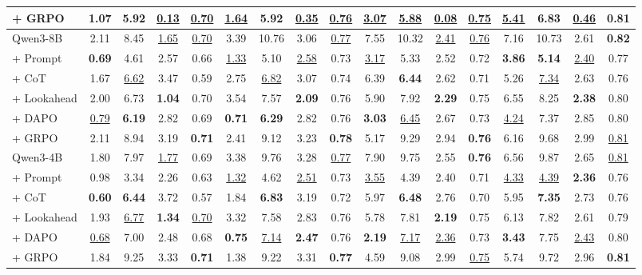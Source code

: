\begin{table}[t]
\begin{tabular}{l cccc cccc cccc cccc}
\scriptsize + GRPO & 1.07 & \textbf{5.92} & \underline{0.13} & \underline{0.70} & \underline{1.64} & \textbf{5.92} & \underline{0.35} & \underline{0.76} & \underline{3.07} & \underline{5.88} & \underline{0.08} & \underline{0.75} & \underline{5.41} & 6.83 & \underline{0.46} & \textbf{0.81} \\
\midrule
Qwen3-8B & 2.11 & 8.45 & \underline{1.65} & \underline{0.70} & 3.39 & 10.76 & 3.06 & \underline{0.77} & 7.55 & 10.32 & \underline{2.41} & \underline{0.76} & 7.16 & 10.73 & 2.61 & \textbf{0.82} \\
\scriptsize + Prompt & \textbf{0.69} & 4.61 & 2.57 & 0.66 & \underline{1.33} & 5.10 & \underline{2.58} & 0.73 & \underline{3.17} & 5.33 & 2.52 & 0.72 & \textbf{3.86} & \textbf{5.14} & \underline{2.40} & 0.77 \\
\scriptsize + CoT & 1.67 & \underline{6.62} & 3.47 & 0.59 & 2.75 & \underline{6.82} & 3.07 & 0.74 & 6.39 & \textbf{6.44} & 2.62 & 0.71 & 5.26 & \underline{7.34} & 2.63 & 0.76 \\
\scriptsize + Lookahead & 2.00 & 6.73 & \textbf{1.04} & 0.70 & 3.54 & 7.57 & \textbf{2.09} & 0.76 & 5.90 & 7.92 & \textbf{2.29} & 0.75 & 6.55 & 8.25 & \textbf{2.38} & 0.80 \\
\scriptsize + DAPO & \underline{0.79} & \textbf{6.19} & 2.82 & 0.69 & \textbf{0.71} & \textbf{6.29} & 2.82 & 0.76 & \textbf{3.03} & \underline{6.45} & 2.67 & 0.73 & \underline{4.24} & 7.37 & 2.85 & 0.80 \\
\scriptsize + GRPO & 2.11 & 8.94 & 3.19 & \textbf{0.71} & 2.41 & 9.12 & 3.23 & \textbf{0.78} & 5.17 & 9.29 & 2.94 & \textbf{0.76} & 6.16 & 9.68 & 2.99 & \underline{0.81} \\
\midrule
Qwen3-4B & 1.80 & 7.97 & \underline{1.77} & 0.69 & 3.38 & 9.76 & 3.28 & \underline{0.77} & 7.90 & 9.75 & 2.55 & \textbf{0.76} & 6.56 & 9.87 & 2.65 & \underline{0.81} \\
\scriptsize + Prompt & 0.98 & 3.34 & 2.26 & 0.63 & \underline{1.32} & 4.62 & \underline{2.51} & 0.73 & \underline{3.55} & 4.39 & 2.40 & 0.71 & \underline{4.33} & \underline{4.39} & \textbf{2.36} & 0.76 \\
\scriptsize + CoT & \textbf{0.60} & \textbf{6.44} & 3.72 & 0.57 & 1.84 & \textbf{6.83} & 3.19 & 0.72 & 5.97 & \textbf{6.48} & 2.76 & 0.70 & 5.95 & \textbf{7.35} & 2.73 & 0.76 \\
\scriptsize + Lookahead & 1.93 & \underline{6.77} & \textbf{1.34} & \underline{0.70} & 3.32 & 7.58 & 2.83 & 0.76 & 5.78 & 7.81 & \textbf{2.19} & 0.75 & 6.13 & 7.82 & 2.61 & 0.79 \\
\scriptsize + DAPO & \underline{0.68} & 7.00 & 2.48 & 0.68 & \textbf{0.75} & \underline{7.14} & \textbf{2.47} & 0.76 & \textbf{2.19} & \underline{7.17} & \underline{2.36} & 0.73 & \textbf{3.43} & 7.75 & \underline{2.43} & 0.80 \\
\scriptsize + GRPO & 1.84 & 9.25 & 3.33 & \textbf{0.71} & 1.38 & 9.22 & 3.31 & \textbf{0.77} & 4.59 & 9.08 & 2.99 & \underline{0.75} & 5.74 & 9.72 & 2.96 & \textbf{0.81} \\
\bottomrule
\end{tabular}
\end{table}


